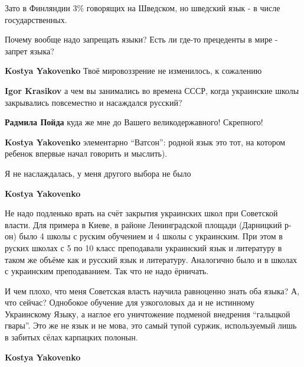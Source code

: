 \begin{itemize}
\begin{itemize}
Зато в Финляндии 3\% говорящих на Шведском, но шведский язык - в числе
государственных.

Почему вообще надо запрещать языки? Есть ли где-то прецеденты в мире - запрет
языка?

\textbf{Kostya Yakovenko} Твоё мировоззрение не изменилось, к сожалению

\textbf{Igor Krasikov} а чем вы занимались во времена СССР, когда украинские школы закрывались повсеместно и насаждался русский?

\textbf{Радмила Пойда} куда же мне до Вашего великодержавного! Скрепного!

\textbf{Kostya Yakovenko} элементарно \enquote{Ватсон}: родной язык это тот, на котором ребенок впервые начал говорить и мыслить).

Я не наслаждалась, у меня другого выбора не было

\textbf{Kostya Yakovenko} 

Не надо подленько врать на счёт закрытия украинских школ при Советской власти.
Для примера в Киеве, в районе Ленинградской площади (Дарницкий р-он) было 4
школы с руским обучением и 4 школы с украинским. При этом в руских школах с 5
по 10 класс преподавали украинский язык и литературу в таком же объёме как и
русский язык и литературу. Аналогично было и в школах с украинским
преподаванием. Так что не надо ёрничать. 

И чем плохо, что меня Советская власть
научила равноценно знать оба языка? А, что сейчас? Однобокое обучение для
узкоголовых да и не истинному Украинскому Языку, а наглое его уничтожение
подменой внедрения \enquote{галыцкой гвары}. Это же не язык и не мова, это самый тупой
суржик, используемый лишь в забитых сёлах карпацких полонын.


\textbf{Kostya Yakovenko} 


\end{itemize}
\end{itemize}
